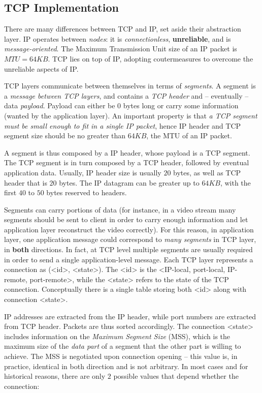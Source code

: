\documentclass[a4paper, 11pt]{report}
\begin{document}
\subsection{TCP Implementation}

There are many differences between TCP and IP, set aside their abstraction
layer. IP operates between \emph{nodes}: it is \emph{connectionless},
\textbf{unreliable}, and is \emph{message-oriented}. The Maximum Transmission
Unit size of an IP packet is $MTU = 64KB$. TCP lies on top of IP, adopting
coutermeasures to overcome the unreliable aspects of IP.

TCP layers communicate between themselves in terms of \emph{segments}. A
segment is a \emph{message between TCP layers}, and contains a \emph{TCP
header} and \--- eventually \--- data \emph{payload}. Payload can either be $0$
bytes long or carry some information (wanted by the application layer). An
important property is that \emph{a TCP segment must be small enough to fit in a
single IP packet}, hence IP header and TCP segment size should be no greater
than $64KB$, the MTU of an IP packet.

A segment is thus composed by a IP header, whose payload is a TCP segment. The
TCP segment is in turn composed by a TCP header, followed by eventual
application data. Usually, IP header size is usually $20$ bytes, as well as TCP
header that is $20$ bytes. The IP datagram can be greater up to $64KB$, with
the first $40$ to $50$ bytes reserved to headers.

Segments can carry portions of data (for instance, in a video stream many
segments should be sent to client in order to carry enough information and let
application layer reconstruct the video correctly). For this reason, in
application layer, one application message could correspond to \emph{many
segments} in TCP layer, in \textbf{both} directions. In fact, at TCP level
multiple segments are usually required in order to send a single
application-level message. Each TCP layer represents a connection as (<id>,
<state>). The <id> is the <IP-local, port-local, IP-remote, port-remote>, while
the <state> refers to the state of the TCP connection. Conceptually there is a
single table storing both <id> along with connection <state>.

IP addresses are extracted from the IP header, while port numbers are extracted
from TCP header. Packets are thus sorted accordingly. The connection <state>
includes information on the \emph{Maximum Segment Size} (MSS), which is the
maximum size of the \emph{data part} of a segment that the other part is
willing to achieve. The MSS is negotiated upon connection opening \--- this
value is, in practice, identical in both direction and is not arbitrary. In
most cases and for historical reasons, there are only $2$ possible values that
depend whether the connection:
\end{document}
